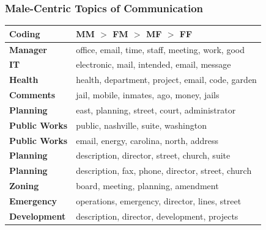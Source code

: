 \documentclass[xcolor={table}, fleqn]{beamer}
\newcommand{\male}[1]{\colorbox{male}{#1}}
\newenvironment{changemargin}[2]{%
  \begin{list}{}{%
    \setlength{\topsep}{0pt}%
    \setlength{\leftmargin}{#1}%
    \setlength{\rightmargin}{#2}%
    \setlength{\listparindent}{\parindent}%
    \setlength{\itemindent}{\parindent}%
    \setlength{\parsep}{\parskip}%
  }%
  \item[]}{\end{list}}
\begin{document}
\begin{frame}\frametitle{Male-Centric Topics of Communication}
	
	
\begin{changemargin}{-.9cm}{ -1cm}	
	\centering
		\begin{tabular}{ll}
			\toprule
			Coding & MM $>$ FM $>$ MF $>$ FF\\
			\midrule

	\male{\textbf{Manager}} & office, email, time, staff, meeting, work, good\\ 

	\male{\textbf{IT}} & electronic, mail, intended, email, message\\ 

	\textbf{Health} & health, department, project, email, code, garden\\ 


	\textbf{Comments} & jail, mobile, inmates, ago, money, jails\\ 

	\male{\textbf{Planning}} & east, planning, street, court, administrator\\ 


	\male{\textbf{Public Works}} & public, nashville, suite, washington\\ 


	\male{\textbf{Public Works}} & email, energy, carolina, north, address\\ 


	\male{\textbf{Planning}} & description, director, street, church, suite\\ 


	\male{\textbf{Planning}} & description, fax, phone, director, street, church\\ 


	\male{\textbf{Zoning}} & board, meeting, planning, amendment\\ 


	\male{\textbf{Emergency}} & operations, emergency, director, lines, street\\ 


	\textbf{Development} & description, director, development, projects\\ 

			\bottomrule
		\end{tabular}
		\end{changemargin}
\end{frame}
\end{document}
